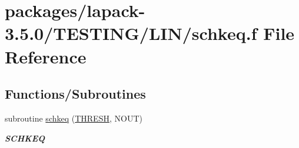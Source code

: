 \hypertarget{schkeq_8f}{}\section{packages/lapack-\/3.5.0/\+T\+E\+S\+T\+I\+N\+G/\+L\+I\+N/schkeq.f File Reference}
\label{schkeq_8f}
\subsection*{Functions/\+Subroutines}
\begin{DoxyCompactItemize}
\item 
subroutine \hyperlink{group__single__lin_ga4c50dfbcd5bb4ce79a0cd9840bb0eab3}{schkeq} (\hyperlink{zlaqgs_8c_a0656018abfc9fa2821827415f5d5ea57}{T\+H\+R\+E\+S\+H}, N\+O\+U\+T)
\begin{DoxyCompactList}\small\item\em {\bfseries S\+C\+H\+K\+E\+Q} \end{DoxyCompactList}\end{DoxyCompactItemize}
